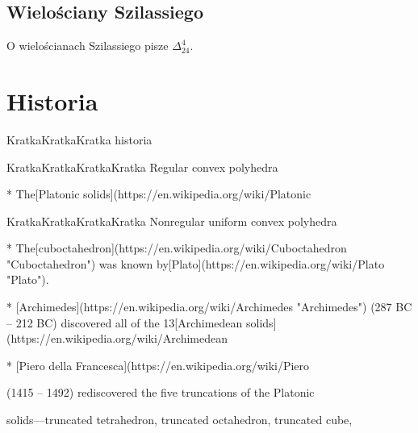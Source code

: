 \subsection{Wielościany Szilassiego}
O wielościanach Szilassiego pisze $\Delta_{24}^4$.

\section{Historia}



KratkaKratkaKratka historia

KratkaKratkaKratkaKratka Regular convex polyhedra

* The[Platonic solids](https://en.wikipedia.org/wiki/Platonic%

KratkaKratkaKratkaKratka Nonregular uniform convex polyhedra

* The[cuboctahedron](https://en.wikipedia.org/wiki/Cuboctahedron "Cuboctahedron") was known by[Plato](https://en.wikipedia.org/wiki/Plato "Plato").

* [Archimedes](https://en.wikipedia.org/wiki/Archimedes "Archimedes") (287 BC – 212 BC) discovered all of the 13[Archimedean solids](https://en.wikipedia.org/wiki/Archimedean%

* [Piero della Francesca](https://en.wikipedia.org/wiki/Piero%

(1415 – 1492) rediscovered the five truncations of the Platonic

solids—truncated tetrahedron, truncated octahedron, truncated cube,

